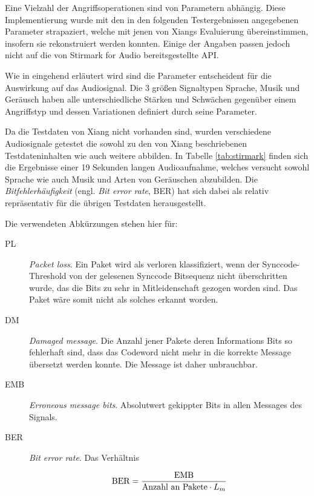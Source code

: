 Eine Vielzahl der Angriffsoperationen sind von Parametern abhängig. Diese Implementierung wurde mit den in den folgenden Testergebnissen angegebenen Parameter strapaziert, welche mit jenen von Xiangs Evaluierung\cite{xiang2007robust} übereinstimmen, insofern sie rekonstruiert werden konnten. Einige der Angaben passen jedoch nicht auf die von Stirmark for Audio bereitsgestellte API. 

Wie in \cite{lang2004stirmark} eingehend erläutert wird sind die Parameter entscheident für die Auswirkung auf das Audiosignal. Die 3 größen Signaltypen Sprache, Musik und Geräusch haben alle unterschiedliche Stärken und Schwächen gegenüber einem Angriffstyp und dessen Variationen definiert durch seine Parameter. 

Da die Testdaten von Xiang nicht vorhanden sind, wurden verschiedene Audiosignale getestet die sowohl zu den von Xiang beschriebenen Testdateninhalten wie auch weitere abbilden. In Tabelle \ref{tab:stirmark} finden sich die Ergebnisse einer 19 Sekunden langen Audioaufnahme, welches versucht sowohl Sprache wie auch Musik und Arten von Geräuschen abzubilden. Die \textit{Bitfehlerhäufigkeit} (engl. \textit{Bit error rate},  BER) hat sich dabei als relativ repräsentativ für die übrigen Testdaten herausgestellt. 

Die verwendeten Abkürzungen stehen hier für:

\begin{description}
	
\item[PL] \textit{Packet loss}. Ein Paket wird als verloren klassifiziert, wenn der Synccode-Threshold von der gelesenen Synccode Bitsequenz nicht überschritten wurde, das die Bits zu sehr in Mitleidenschaft gezogen worden sind. Das Paket wäre somit nicht als solches erkannt worden. 

\item[DM] \textit{Damaged message}. Die Anzahl jener Pakete deren Informations Bits so fehlerhaft sind, dass das Codeword nicht mehr in die korrekte Message übersetzt werden konnte. Die Message ist daher unbrauchbar.

\item[EMB] \textit{Erroneous message bits}. Absolutwert gekippter Bits in allen Messages des Signals. 

\item[BER] \textit{Bit error rate}. Das Verhältnis 

	\begin{equation}
		\mbox{BER} = {\mbox{EMB} \over \mbox{Anzahl an Pakete} \cdot {L}_{m}}
		\label{equ:ber}
	\end{equation}
\end{description}

